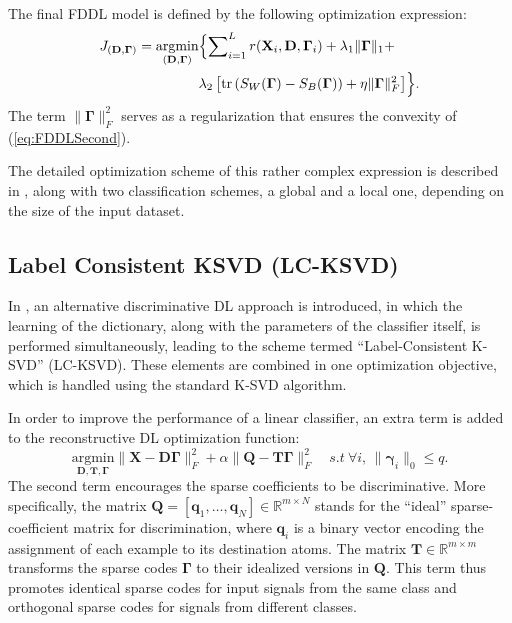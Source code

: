 \documentclass[journal]{IEEEtran}
\newcommand{\bD}{\mathbf{D}}
\newcommand{\bq}{\mathbf{q}}
\newcommand{\bX}{\mathbf{X}}
\newcommand{\bT}{\mathbf{T}}
\newcommand{\bQ}{\mathbf{Q}}
\newcommand{\bGamma}{\boldsymbol{\Gamma}}
\newcommand{\bgamma}{\boldsymbol{\gamma}}
\begin{document}
The final FDDL model is defined by the following optimization expression:
\begin{equation}\label{eq:FDDLFinal}
\begin{aligned}
     J_{\left(\bD,\bGamma\right)}= \underset{(\bD,\bGamma)}{\text{argmin}} &\Bigl \{ \sum\nolimits_{i=1}^L{r(\bX_i,\bD,\bGamma_i)}+\lambda_1 \|\bGamma\|_1 + \\
    & \lambda_2 \left[\text{tr}\left(S_W(\bGamma)-S_B(\bGamma)\right) + \eta \|\bGamma\|_F^2 \right]\Bigr \}.
\end{aligned}
\end{equation}
The term $\|\bGamma\|_F^2$ serves as a regularization that ensures the convexity of (\ref{eq:FDDLSecond}).

The detailed optimization scheme of this rather complex expression is described in \cite{FDDL}, along with two classification schemes, a global and a local one, depending on the size of the input dataset.

\subsection{Label Consistent KSVD (LC-KSVD)} \label{SS:LCKSVD}

In \cite{LCKSVD,LCKSVD2}, an alternative discriminative DL approach is introduced, in which the learning of the dictionary, along with the parameters of the classifier itself, is performed simultaneously, leading to the scheme termed ``Label-Consistent K-SVD'' (LC-KSVD). These elements are combined in one optimization objective, which is handled using the standard K-SVD algorithm.


In order to improve the performance of a linear classifier, an extra term is added to the reconstructive DL optimization function:
\begin{equation}\label{eq:LC-KSVD1}
\underset{\bD,\bT,\bGamma}{\text{argmin}} \|\bX - \bD \bGamma\|_F^2
  + \alpha \|\bQ - \bT \bGamma\|_F^2 \quad s.t \ \forall i, \, \|\bgamma_i\|_0 \leq q.
\end{equation}
The second term encourages the sparse coefficients to be discriminative. More specifically, the matrix $\bQ=[\bq_1,\ldots,\bq_N] \in \mathbb{R}^{m \times N}$ stands for the ``ideal'' sparse-coefficient matrix for discrimination, where $\bq_{i}$ is a binary vector encoding the assignment of each example to its destination atoms. The matrix $\bT \in \mathbb{R}^{m \times m}$ transforms the sparse codes $\bGamma$ to their idealized versions in $\bQ$. This term thus promotes identical sparse codes for input signals from the same class and orthogonal sparse codes for signals from different classes.
\end{document}
